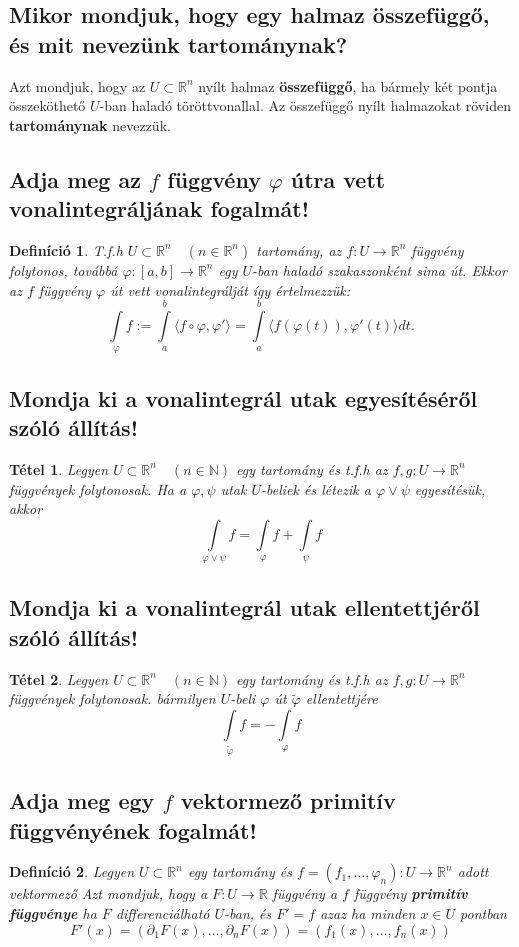 \documentclass[12pt,a4paper]{article}
\newcommand{\R}{\mathbb{R}}
\newcommand{\N}{\mathbb{N}}
\newcommand{\f}{\varphi}
\newcommand{\bb}[1]{\left( #1 \right)}
\newcommand{\angels}[1]{\langle #1 \rangle}
\newcommand{\boxes}[1]{\left[ #1 \right]}
\newtheorem{tet}{Tétel}[section]
\newtheorem{defi}{Definíció}[section]
\begin{document}
\subsection{Mikor mondjuk, hogy egy halmaz összefüggő, és mit nevezünk tartománynak?}
Azt mondjuk, hogy az $U \subset \R^n$ nyílt halmaz \textbf{összefüggő}, ha bármely két pontja összeköthető $U$-ban haladó töröttvonallal. Az összefüggő nyílt halmazokat röviden \textbf{tartománynak} nevezzük.
\subsection{Adja meg az $f$ függvény $\f$ útra vett vonalintegráljának fogalmát!}
\begin{defi}
T.f.h $U \subset \R^n \quad (n \in \R^n)$ tartomány, az $f: U \to  \R^n$ függvény folytonos, továbbá $\f : \boxes{a,b} \to  \R^n$ egy $U$-ban  haladó szakaszonként sima út. Ekkor az $f$ függvény $\f$ út vett vonalintegrálját így értelmezzük:
\[
\int\limits_\f f := \int\limits^b_a \angels{f \circ \f,\f'} = \int\limits^b_a \angels{f(\f(t)), \f'(t)} dt.
\]
\end{defi}
\subsection{Mondja ki a vonalintegrál utak egyesítéséről szóló állítás!}
\begin{tet}
Legyen $U \subset \R^n \quad (n\in \N)$ egy tartomány és t.f.h az $f,g : U \to \R^n$ függvények folytonosak.
Ha a $\f,\psi$ utak $U$-beliek és létezik a $\f \vee \psi $ egyesítésük, akkor
\[
\int\limits_{\f \vee \psi } f = \int\limits_\f f + \int\limits_\psi f
\]
\end{tet}
\subsection{Mondja ki a vonalintegrál utak ellentettjéről szóló állítás!}
\begin{tet}
Legyen $U \subset \R^n \quad (n\in \N)$ egy tartomány és t.f.h az $f,g : U \to \R^n$ függvények folytonosak.
bármilyen $U$-beli $\f$ út $\tilde{\f}$ ellentettjére
\[
\int\limits_{\tilde{\f}} f = -\int\limits_\f f 
\]
\end{tet}
\subsection{Adja meg egy $f$ vektormező primitív függvényének fogalmát!}
\begin{defi}
Legyen $U \subset \R^n$ egy tartomány és  $f = (f_1,\ldots,\f_n): U \to \R^n$ adott vektormező Azt mondjuk, hogy a $F : U \to \R$ függvény a $f$ függvény \textbf{primitív függvénye} ha $F$ differenciálható $U$-ban, és $F' = f$ azaz  ha minden $x \in U$ pontban
\[
F'(x) = \bb{\partial_1F(x),\ldots,\partial_nF(x)} = \bb{f_1(x),\ldots,f_n(x)}
\]
\end{defi}
\end{document}
